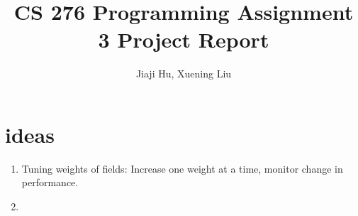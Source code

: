 \documentclass[10pt,twocolumn]{article}
\begin{document}
\title{CS 276 Programming Assignment 3 Project Report}
\author{Jiaji Hu, Xuening Liu}
\date{}
\maketitle

\section{ideas}
\begin{enumerate}
\item 
Tuning weights of fields: Increase one weight at a time, monitor change in performance.
\item
\end{enumerate}
\end{document}

